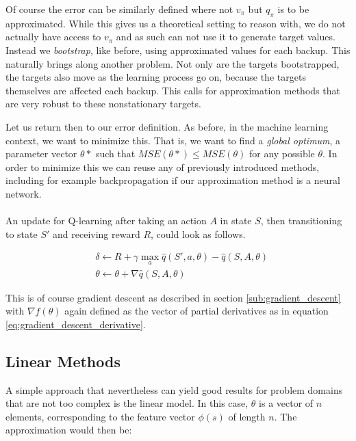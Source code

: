 Of course the error can be similarly defined
where not $v_\pi$ but $q_\pi$ is to be approximated.
While this gives us a theoretical setting to reason with,
we do not actually have access to $v_\pi$
and as such can not use it to generate target values.
Instead we \textit{bootstrap}, like before,
using approximated values for each backup.
This naturally brings along another problem.
Not only are the targets bootstrapped,
the targets also move as the learning process go on,
because the targets themselves are affected each backup.
This calls for approximation methods that
are very robust to these nonstationary targets.

Let us return then to our error definition.
As before, in the machine learning context,
we want to minimize this.
That is, we want to find a \textit{global optimum},
a parameter vector $\theta*$
such that $MSE(\theta*) \leq MSE(\theta)$ for any possible $\theta$.
In order to minimize this we can reuse any of previously introduced methods,
including for example backpropagation
if our approximation method is a neural network.

\paragraph{}
An update for Q-learning
after taking an action $A$ in state $S$,
then transitioning to state $S'$ and receiving reward $R$,
could look as follows.

\begin{align*}
  &\delta \gets R + \gamma \max_a \hat{q}(S', a, \theta) - \hat{q}(S, A, \theta) \\
  &\theta \gets \theta + \nabla \hat{q}(S, A, \theta)
\end{align*}

This is of course gradient descent
as described in section \ref{sub:gradient_descent}
with $\nabla f(\theta)$
again defined as the vector of partial derivatives
as in equation \ref{eq:gradient_descent_derivative}.

\subsection{Linear Methods}
\label{sub:linear_methods}
A simple approach that nevertheless can yield good results
for problem domains that are not too complex
is the linear model.
In this case, $\theta$ is a vector of $n$ elements,
corresponding to the feature vector $\phi(s)$ of length $n$.
The approximation would then be:


